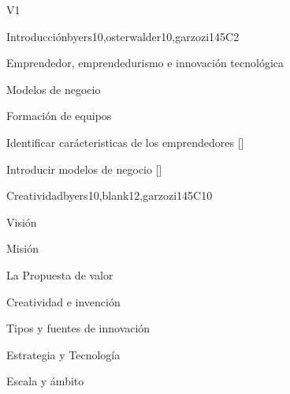 \begin{syllabus}
\begin{competences}{V1}
   \end{competences}
   
   
   
   \begin{unit}{}{Introducción}{byers10,osterwalder10,garzozi14}{5}{C2}
   \begin{topics}
         \item Emprendedor, emprendedurismo e innovación tecnológica
         \item Modelos de negocio
         \item Formación de equipos
      \end{topics}
   
       \begin{learningoutcomes} 
         \item Identificar carácteristicas de los emprendedores  [\Familiarity]
         \item Introducir modelos de negocio  [\Familiarity]
       \end{learningoutcomes} 
   \end{unit}
   
   \begin{unit}{}{Creatividad}{byers10,blank12,garzozi14}{5}{C10}
   \begin{topics}
         \item Visión
         \item Misión
         \item La Propuesta de valor
         \item Creatividad e invención
         \item Tipos y fuentes de innovación
         \item Estrategia y Tecnología
         \item Escala y ámbito
      \end{topics}
   

\end{unit}
\end{syllabus}
